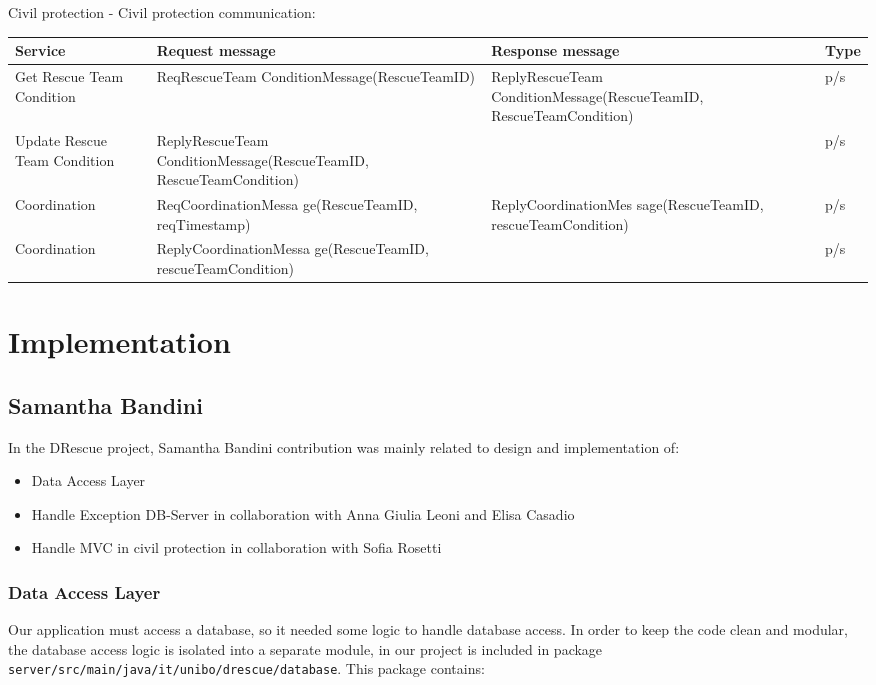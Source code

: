 \documentclass[a4paper,12pt]{report}
\begin{document}
Civil protection - Civil protection communication:

\begin{center}
\begin{tabular}{ |p{4cm}|p{4cm}|p{4cm}|p{2cm}| } \hline
Service 			& Request message 	& Response message		& Type 	\\
\hline
Get Rescue Team Condition	& ReqRescueTeam ConditionMessage(RescueTeamID)	& ReplyRescueTeam ConditionMessage(RescueTeamID, RescueTeamCondition) 	& p/s	\\ 
Update Rescue Team Condition	&  ReplyRescueTeam ConditionMessage(RescueTeamID, RescueTeamCondition) 	& 	& p/s	\\ 
Coordination	&  ReqCoordinationMessa ge(RescueTeamID, reqTimestamp) 	& ReplyCoordinationMes
sage(RescueTeamID, rescueTeamCondition)	& p/s	\\
Coordination	&  ReplyCoordinationMessa ge(RescueTeamID, rescueTeamCondition) 	& 	& p/s	\\
\hline
\end{tabular}
\end{center}

\chapter{Implementation}

\section{Samantha Bandini}
In the DRescue project, Samantha Bandini contribution was mainly related to design and implementation of:
\begin{itemize}
\item Data Access Layer 
\item Handle Exception DB-Server in collaboration with Anna Giulia Leoni and Elisa Casadio
\item Handle MVC in civil protection in collaboration with Sofia Rosetti
\end{itemize}

\subsection{Data Access Layer}

Our application must access a database, so it needed some logic to handle database access. In order to keep the code clean and modular, the database access logic is isolated into a separate module, in our project is included in package\\ \texttt{server/src/main/java/it/unibo/drescue/database}. This package contains:\\
\end{document}
